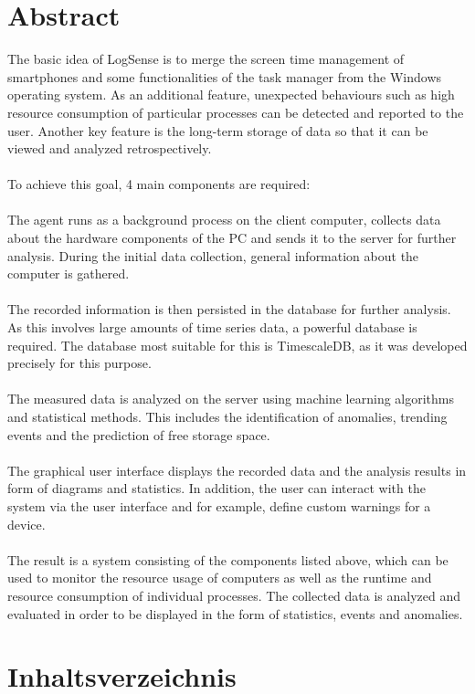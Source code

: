 \documentclass{report}
\begin{document}
\chapter*{Abstract}
The basic idea of LogSense is to merge the screen time management of smartphones and some functionalities of the task manager from the Windows operating system. As an additional feature, unexpected behaviours such as high resource consumption of particular processes can be detected and reported to the user. Another key feature is the long-term storage of data so that it can be viewed and analyzed retrospectively.\\\\

\noindent To achieve this goal, 4 main components are required:\\\\
The agent runs as a background process on the client computer, collects data about the hardware components of the PC and sends it to the server for further analysis. During the initial data collection, general information about the computer is gathered.\\\\
The recorded information is then persisted in the database for further analysis. As this involves large amounts of time series data, a powerful database is required. The database most suitable for this is TimescaleDB, as it was developed precisely for this purpose.\\\\
The measured data is analyzed on the server using machine learning algorithms and statistical methods. This includes the identification of anomalies, trending events and the prediction of free storage space.\\\\
The graphical user interface displays the recorded data and the analysis results in form of diagrams and statistics. In addition, the user can interact with the system via the user interface and for example, define custom warnings for a device.\\\\

\noindent The result is a system consisting of the components listed above, which can be used to monitor the resource usage of computers as well as the runtime and resource consumption of individual processes. The collected data is analyzed and evaluated in order to be displayed in the form of statistics, events and anomalies.


\chapter*{Inhaltsverzeichnis}
\end{document}
